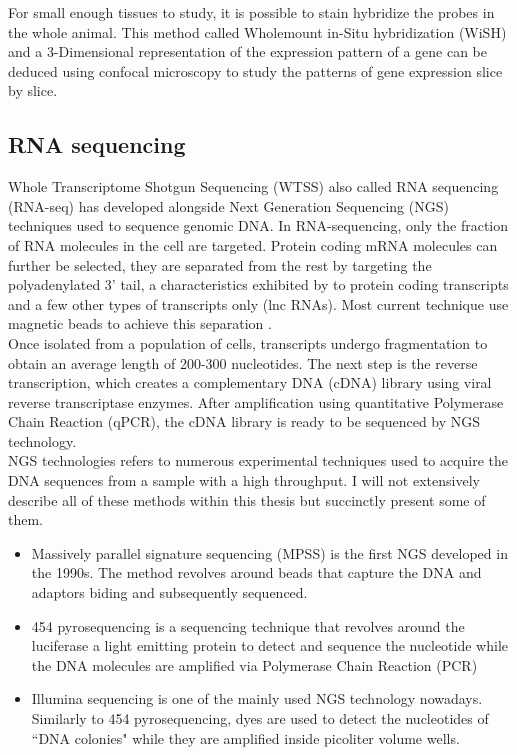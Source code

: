      For small enough tissues to study, it is possible to stain hybridize the probes in the whole animal. This method called Wholemount in-Situ hybridization (WiSH) and a 3-Dimensional representation of the expression pattern of a gene can be deduced using confocal microscopy to study the patterns of gene expression slice by slice.
     

     \subsection{RNA sequencing}
     Whole Transcriptome Shotgun Sequencing (WTSS) also called RNA sequencing (RNA-seq) \cite{morin08,wang09} has developed alongside Next Generation Sequencing (NGS) techniques used to sequence genomic DNA. In RNA-sequencing, only the fraction of RNA molecules in the cell are targeted. Protein coding mRNA molecules can further be selected, they are separated from the rest by targeting the polyadenylated 3' tail, a characteristics exhibited by to protein coding transcripts and a few other types of transcripts only (lnc RNAs). Most current technique use magnetic beads to achieve this separation \cite{mortazavi08,morin08}.\\
     
    Once isolated from a population of cells, transcripts undergo fragmentation to obtain an average length of 200-300 nucleotides. The next step is the reverse transcription, which creates a complementary DNA (cDNA) library using viral reverse transcriptase enzymes. After amplification using quantitative Polymerase Chain Reaction (qPCR), the cDNA library is ready to be sequenced by NGS technology.\\
    
    NGS technologies refers to numerous experimental techniques used to acquire the DNA sequences from a sample with a high throughput. I will not extensively describe all of these methods within this thesis but succinctly present some of them. 
    
\begin{itemize}
	\item Massively parallel signature sequencing (MPSS) \cite{brenner00} is the first NGS developed in the 1990s. The method revolves around beads that capture the DNA and adaptors biding and subsequently sequenced.
	
	\item 454 pyrosequencing \cite{margulies05} is a sequencing technique that revolves around the luciferase a light emitting protein to detect and sequence the nucleotide while the DNA molecules are amplified via Polymerase Chain Reaction (PCR)
	
	\item Illumina sequencing \cite{bentley08} is one of the mainly used NGS technology nowadays. Similarly to 454 pyrosequencing, dyes are used to detect the nucleotides of ``DNA colonies" while they are amplified inside picoliter volume wells.
    
\end{itemize}     
    
